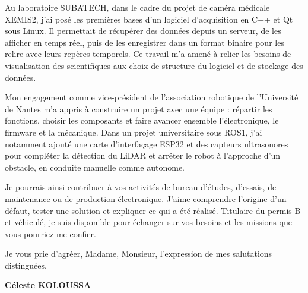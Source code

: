 \documentclass[11pt,a4paper]{article}
\begin{document}
Au laboratoire SUBATECH, dans le cadre du projet de caméra
médicale XEMIS2, j'ai posé les premières bases d'un logiciel
d'acquisition en C++ et Qt sous Linux. Il permettait
de récupérer des données depuis un serveur, de les afficher
en temps réel, puis de les enregistrer dans un format binaire
pour les relire avec leurs repères temporels. Ce travail
m'a amené à relier les besoins de visualisation des scientifiques
aux choix de structure du logiciel et de stockage des données.

Mon engagement comme vice-président de l'association
robotique de l'Université de Nantes m'a appris à construire
un projet avec une équipe : répartir les fonctions, choisir
les composants et faire avancer ensemble l'électronique,
le firmware et la mécanique. Dans un projet universitaire
sous ROS1, j'ai notamment ajouté une carte d'interfaçage ESP32
et des capteurs ultrasonores pour compléter la détection
du LiDAR et arrêter le robot à l'approche d'un obstacle,
en conduite manuelle comme autonome.

Je pourrais ainsi contribuer à vos activités de bureau
d'études, d'essais, de maintenance ou de production
électronique. J'aime comprendre l'origine d'un défaut,
tester une solution et expliquer ce qui a été réalisé.
Titulaire du permis B et véhiculé, je suis disponible
pour échanger sur vos besoins et les missions que
vous pourriez me confier.

Je vous prie d'agréer, Madame, Monsieur, l'expression
de mes salutations distinguées.

\hfill\textbf{Céleste KOLOUSSA}
\end{document}
